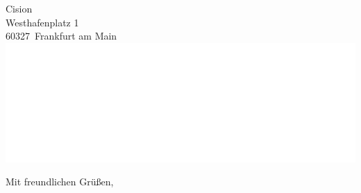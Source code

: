 \documentclass[a4paper, 12pt, KOMAold]{scrlttr2}
\newcommand{\Empfaenger}{Cision}            %
\newcommand{\EStrasse}{Westhafenplatz 1}    %
\newcommand{\EPLZ}{60327}                   %
\newcommand{\EOrt}{Frankfurt am Main}       %
\begin{document}
\begin{letter}{\Empfaenger \\ \EStrasse \\ \EPLZ~\EOrt}
    \includegraphics[width=\textwidth]{ausweis}
    \closing{Mit freundlichen Grüßen,}
    \end{letter}
\end{document}
